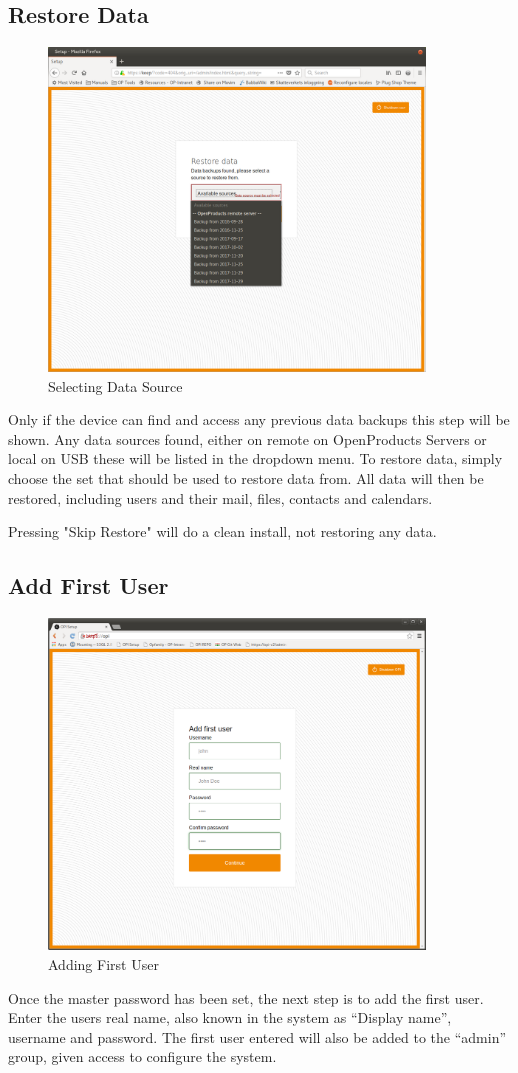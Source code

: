 \documentclass[12pt,a4paper,titlepage]{article}
\begin{document}
\newpage
\subsection{Restore Data}
\begin{figure}[h!]
\centering
\includegraphics[width=10cm]{./img/restore}
\caption{Selecting Data Source}
\end{figure}
Only if the device can find and access any previous data backups this step will be shown. Any data sources found, either on remote on OpenProducts Servers or local on USB these will be listed in the dropdown menu. To restore data, simply choose the set that should be used to restore data from. All data will then be restored, including users and their mail, files, contacts and calendars.

Pressing "Skip Restore" will do a clean install, not restoring any data.

\newpage
\subsection{Add First User}
\begin{figure}[h!]
\centering
\includegraphics[width=10cm]{./img/first_user}
\caption{Adding First User}
\end{figure}
Once the master password has been set, the next step is to add the first user. Enter the users real name, also known in the system as ``Display name'', username and password. The first user entered will also be added to the ``admin'' group, given access to configure the system.
\end{document}
